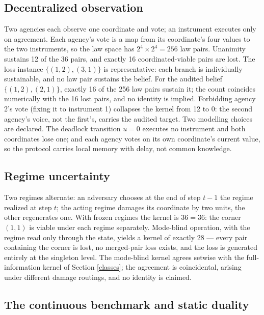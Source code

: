 \documentclass[10pt,twocolumn]{article}
\theoremstyle{definition}
\begin{document}
\subsection{Decentralized observation}\label{decentralized}

Two agencies each observe one coordinate and vote; an instrument
executes only on agreement. Each agency's vote is a map from its
coordinate's four values to the two instruments, so the law space has
\(2^{4} \times 2^{4} = 256\) law pairs. Unanimity sustains 12 of the 36
pairs, and exactly 16 coordinated-viable pairs are lost. The loss
instance \(\{(1,2),(3,1)\}\) is representative: each branch is
individually sustainable, and no law pair sustains the belief. For the
audited belief \(\{(1,2),(2,1)\}\), exactly 16 of the 256 law pairs
sustain it; the count coincides numerically with the 16 lost pairs, and
no identity is implied. Forbidding agency 2's vote (fixing it to
instrument 1) collapses the kernel from 12 to 0: the second agency's
voice, not the first's, carries the audited target. Two modelling
choices are declared. The deadlock transition \(u = 0\) executes no
instrument and both coordinates lose one; and each agency votes on its
own coordinate's current value, so the protocol carries local memory
with delay, not common knowledge.

\subsection{Regime uncertainty}\label{regimes}

Two regimes alternate: an adversary chooses at the end of step
\(t - 1\) the regime realized at step \(t\); the acting regime damages
its coordinate by two units, the other regenerates one. With frozen
regimes the kernel is \(36 = 36\): the corner \((1,1)\) is viable under
each regime separately. Mode-blind operation, with the regime read only
through the state, yields a kernel of exactly 28 --- every pair
containing the corner is lost, no merged-pair loss exists, and the loss
is generated entirely at the singleton level. The mode-blind kernel
agrees setwise with the full-information kernel of Section
\ref{classes}; the agreement is coincidental, arising under different
damage routings, and no identity is claimed.

\subsection{The continuous benchmark and static duality}\label{benchmark}
\end{document}
